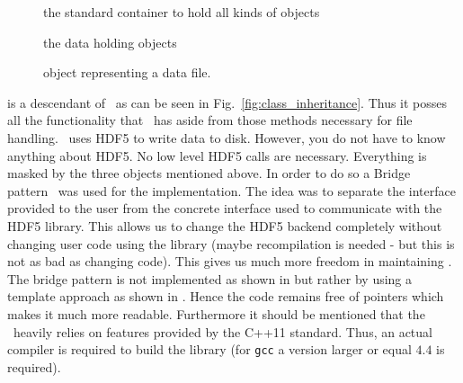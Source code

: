 \begin{description}
\item[\nxgroup] the standard container to hold all kinds of objects
\item[\nxfield] the data holding objects
\item[\nxfile] object representing a data file.
\end{description}
\nxfile is a descendant of \nxgroup\ as can be seen in
Fig.~\ref{fig:class_inheritance}. Thus it posses all the functionality that 
\nxgroup\ has aside from those methods necessary for file handling. 
\pninx\ uses HDF5 to write data to disk. However, you do not have to know 
anything about HDF5. No low level HDF5 calls are necessary. Everything is 
masked by the three objects mentioned above. 
In order to do so a Bridge pattern~\cite{book:gof} was used for the
implementation. The idea was to separate the interface provided to the user from the 
concrete interface used to communicate with the HDF5 library. 
This allows us to change the HDF5 backend completely without changing 
user code using the library (maybe recompilation is needed - but this is not as
bad as changing code). This gives us much more freedom in maintaining \pninx.
The bridge pattern is not implemented as shown in \cite{book:gof} but rather 
by using a template approach as shown  in \cite{book:alexandrescu}.
Hence the code remains free of pointers which makes it much more readable. 
Furthermore it should be mentioned that the \pninx\ heavily relies on features 
provided by the C++11 standard. Thus, an actual compiler is required to 
build the library (for {\tt gcc} a version larger or equal $4.4$ is required).
 

